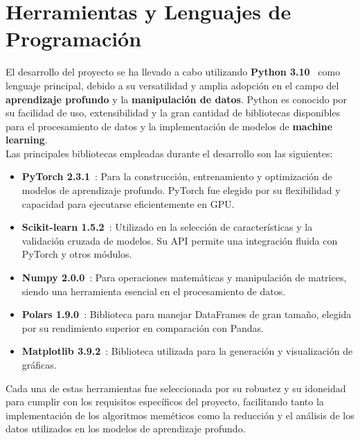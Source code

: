 \section{Herramientas y Lenguajes de Programación}\label{sec:herramientas-y-lenguajes-de-programacion}
El desarrollo del proyecto se ha llevado a cabo utilizando \textbf{Python 3.10}~\cite{vanderplas_python_2016} como
lenguaje principal, debido a su versatilidad y amplia adopción en el campo del \textbf{aprendizaje profundo} y la
\textbf{manipulación de datos}.
Python es conocido por su facilidad de uso, extensibilidad y la gran cantidad de bibliotecas disponibles para el
procesamiento de datos y la implementación de modelos de \textbf{machine learning}. \\[6pt]

Las principales bibliotecas empleadas durante el desarrollo son las siguientes:
\begin{itemize}
    \item \textbf{PyTorch 2.3.1}~\cite{ketkar_introduction_2021, noauthor_torchcuda_nodate}: Para la construcción,
    entrenamiento y optimización de modelos de aprendizaje profundo.
    PyTorch fue elegido por su flexibilidad y capacidad para ejecutarse eficientemente en GPU\@.
    \item \textbf{Scikit-learn 1.5.2}~\cite{kramer_scikit-learn_2016}: Utilizado en la selección de características y
    la validación cruzada de modelos.
    Su API permite una integración fluida con PyTorch y otros módulos.
    \item \textbf{Numpy 2.0.0}~\cite{noauthor_numpy_nodate}: Para operaciones matemáticas y manipulación de matrices,
    siendo una herramienta esencial en el procesamiento de datos.
    \item \textbf{Polars 1.9.0}~\cite{noauthor_polars_nodate}: Biblioteca para manejar DataFrames de gran tamaño,
    elegida por su rendimiento superior en comparación con Pandas.
    \item \textbf{Matplotlib 3.9.2}~\cite{noauthor_matplotlib_nodate}: Biblioteca utilizada para la generación y
    visualización de gráficas.
\end{itemize}

Cada una de estas herramientas fue seleccionada por su robustez y su idoneidad para cumplir con los requisitos
específicos del proyecto, facilitando tanto la implementación de los algoritmos meméticos como la reducción y el
análisis de los datos utilizados en los modelos de aprendizaje profundo. \\[6pt]

